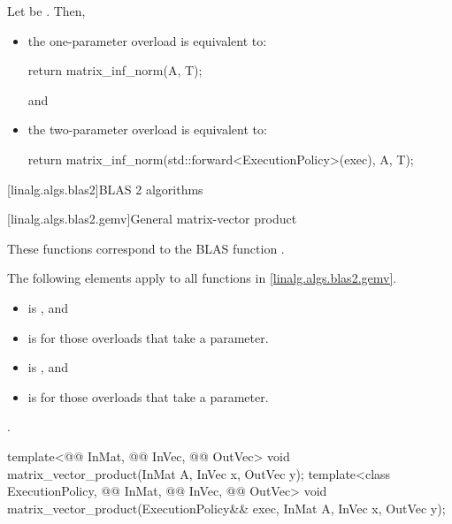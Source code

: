 \begin{itemdescr}

\pnum
\effects
Let  be
.
Then,
\begin{itemize}
\item
the one-parameter overload is equivalent to:
\begin{codeblock}
return matrix_inf_norm(A, T{});
\end{codeblock}
and
\item
the two-parameter overload is equivalent to:
\begin{codeblock}
return matrix_inf_norm(std::forward<ExecutionPolicy>(exec), A, T{});
\end{codeblock}
\end{itemize}
\end{itemdescr}

[linalg.algs.blas2]{BLAS 2 algorithms}

[linalg.algs.blas2.gemv]{General matrix-vector product}

\pnum
\begin{note}
These functions correspond to the BLAS function .
\end{note}

\pnum
The following elements apply to all functions in \ref{linalg.algs.blas2.gemv}.

\pnum
\mandates
\begin{itemize}
\item
{}
is , and
\item
{}
is  for those overloads that take a  parameter.
\end{itemize}

\pnum
\expects
\begin{itemize}
\item
{} is , and
\item
{} is  for those overloads that take a  parameter.
\end{itemize}

\pnum
\complexity
{}.

%
\begin{itemdecl}
template<@@ InMat, @@ InVec, @@ OutVec>
  void matrix_vector_product(InMat A, InVec x, OutVec y);
template<class ExecutionPolicy, @@ InMat, @@ InVec, @@ OutVec>
  void matrix_vector_product(ExecutionPolicy&& exec, InMat A, InVec x, OutVec y);
\end{itemdecl}

